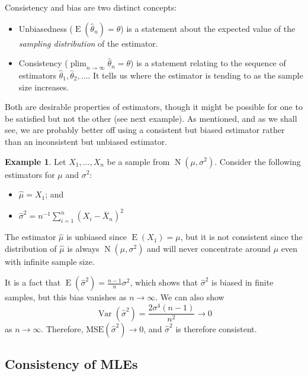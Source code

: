 \documentclass[
]{book}
\providecommand{\tightlist}{%
  \setlength{\itemsep}{0pt}\setlength{\parskip}{0pt}}
\DeclareMathOperator{\E}{E}
\DeclareMathOperator{\Var}{Var}
\DeclareMathOperator{\N}{N}
\DeclareMathOperator*{\plim}{plim}
\theoremstyle{definition}
\theoremstyle{definition}
\newtheorem{example}{Example}[chapter]
\theoremstyle{definition}
\theoremstyle{definition}
\theoremstyle{remark}
\begin{document}
Consistency and bias are two distinct concepts:

\begin{itemize}
\item
  Unbiasedness (\(\E(\hat\theta_n) = \theta\)) is a statement about the
  expected value of the \emph{sampling distribution} of the estimator.
\item
  Consistency (\(\plim_{n\to\infty}\hat\theta_n = \theta\)) is a statement relating to the sequence of estimators \(\hat\theta_1, \hat\theta_2, \dots\). It tells us
  where the estimator is tending to as the
  sample size increases.
\end{itemize}

Both are desirable properties of estimators, though it might be possible
for one to be satisfied but not the other (see next example).
As mentioned, and as we shall see, we are probably better off using a consistent but biased estimator rather than an inconsistent but unbiased estimator.

\begin{example}
Let \(X_1,\dots,X_n\) be a sample from \(\N(\mu,\sigma^2)\). Consider the following estimators for \(\mu\) and \(\sigma^2\):

\begin{itemize}
\tightlist
\item
  \(\hat\mu=X_1\); and
\item
  \(\hat\sigma^2=n^{-1}\sum_{i=1}^n (X_i-\bar X_n)^2\)
\end{itemize}

The estimator \(\hat\mu\) is unbiased since \(\E(X_1)=\mu\), but it is not consistent since the distribution of \(\hat\mu\) is always \(\N(\mu,\sigma^2)\) and will never concentrate around \(\mu\) even with infinite sample size.

It is a fact that
\(\E(\hat\sigma^2) = \frac{n-1}{n}\sigma^2\), which shows that \(\hat\sigma^2\)
is biased in finite samples, but this bias vanishes as \(n\to\infty\). We can also show
\[\Var(\hat\sigma^2) = \frac{2\sigma^4(n-1)}{n^2} \to 0\] as
\(n\to\infty\). Therefore, \(\text{MSE}(\hat\sigma^2)\to 0\), and
\(\hat\sigma^2\) is therefore consistent.
\end{example}

\hypertarget{consistency-of-mles}{%
\subsection{Consistency of MLEs}\label{consistency-of-mles}}
\end{document}
